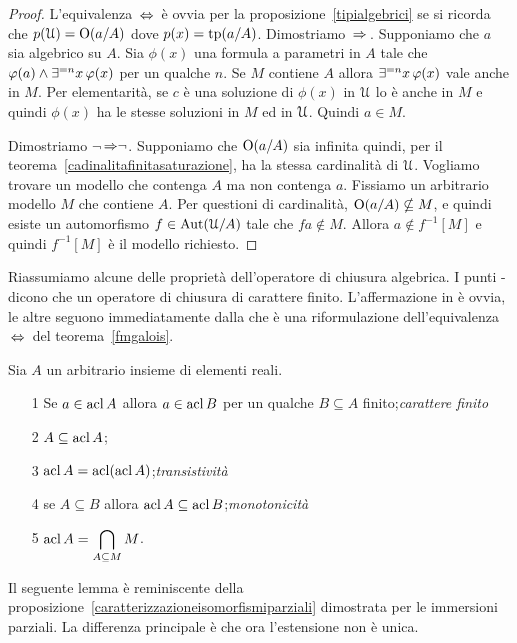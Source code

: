 \begin{proof} 
L'equivalenza $\,\Leftrightarrow\,$ \`e ovvia per la proposizione~\ref{tipialgebrici} se si ricorda che $p(\EuScript U)=\textrm{O}(a/A)$ dove $p(x)=\textrm{tp}(a/A)$. Dimostriamo $\,\Rightarrow\,$. Supponiamo che $a$ sia algebrico su $A$. Sia $\phi(x)$ una formula a parametri in $A$ tale che $\varphi(a)\wedge\exists^{= n}x\,\varphi(x)$ per un qualche $n$. Se $M$ contiene $A$ allora $\exists^{=n}x\,\varphi(x)$ vale anche in $M$. Per elementarit\`a, se $c$ \`e una soluzione di $\phi(x)$ in $\EuScript U$ lo \`e anche in $M$ e quindi $\phi(x)$ ha le stesse soluzioni in $M$ ed in $\EuScript U$. Quindi $a\in M$.

Dimostriamo $\neg$$\,{\Rightarrow}\neg$. Supponiamo che $\textrm{O}(a/A)$ sia infinita quindi, per il teorema~\ref{cadinalitafinitasaturazione}, ha la stessa cardinalit\`a di $\EuScript U$. Vogliamo trovare un modello che contenga $A$ ma non contenga $a$. Fissiamo un arbitrario modello $M$ che contiene $A$. Per questioni di cardinalit\`a, $\textrm{O}(a/A)\nsubseteq M$, e quindi esiste un automorfismo $f\in\textrm{Aut}(\EuScript U/A)$ tale che $fa\notin M$. Allora $a\notin f^{-1}[M]$ e quindi $f^{-1}[M]$ \`e il modello richiesto.
\end{proof}

Riassumiamo alcune delle propriet\`a dell'operatore di chiusura algebrica. I punti - dicono che un operatore di chiusura di carattere finito. L'affermazione in  \`e ovvia, le altre seguono immediatamente dalla  che \`e una riformulazione dell'equivalenza $\,\Leftrightarrow\,$ del teorema~\ref{fmgalois}.

\begin{corollary}\label{fmacl123} Sia $A$ un arbitrario insieme di elementi reali.
\begin{itemize}
\item[1]  Se $a\in\mathop{\rm acl} A$ allora $a\in\mathop{\rm acl} B$ per un qualche $B\subseteq A$ finito;\hfill\emph{carattere finito}
\item[2]  $A\subseteq \mathop{\rm acl} A$;
\item[3]  $\mathop{\rm acl} A=\mathop{\rm acl}(\mathop{\rm acl} A)$;\hfill\emph{transistivit\`a}
\item[4]  se $A\subseteq B$ allora $\mathop{\rm acl} A\subseteq \mathop{\rm acl} B$;\hfill\emph{monotonicit\`a}
\item[5]  $\displaystyle\mathop{\rm acl} A=\bigcap_{A\subseteq M}M$.\QED
\end{itemize} 
\end{corollary}

Il seguente lemma \`e reminiscente della proposizione~\ref{caratterizzazioneisomorfismiparziali} dimostrata per le immersioni parziali. La differenza principale \`e che ora l'estensione non \`e unica.

